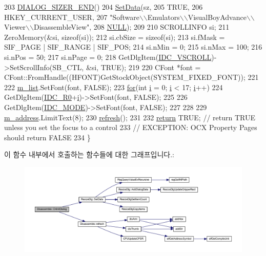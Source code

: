 \begin{DoxyCode}
203     \mbox{\hyperlink{_resize_dlg_8h_aeac0c1e32f30e0763df5736e4b3ea50a}{DIALOG\_SIZER\_END}}()
204     \mbox{\hyperlink{class_resize_dlg_a6a3965f44a0c2f5ba9aaa798a9a81df5}{SetData}}(sz,
205             TRUE,
206             HKEY\_CURRENT\_USER,
207             "Software\(\backslash\)\(\backslash\)Emulators\(\backslash\)\(\backslash\)VisualBoyAdvance\(\backslash\)\(\backslash\)Viewer\(\backslash\)\(\backslash\)DisassembleView",
208             \mbox{\hyperlink{getopt1_8c_a070d2ce7b6bb7e5c05602aa8c308d0c4}{NULL}});
209 
210   SCROLLINFO si;
211   ZeroMemory(&si, sizeof(si));
212   si.cbSize = sizeof(si);
213   si.fMask = SIF\_PAGE | SIF\_RANGE | SIF\_POS;
214   si.nMin = 0;
215   si.nMax = 100;
216   si.nPos = 50;
217   si.nPage = 0;
218   GetDlgItem(\mbox{\hyperlink{resource_8h_a420d68e24dfd23b92f4c35464790687e}{IDC\_VSCROLL}})->SetScrollInfo(SB\_CTL, &si, TRUE);
219   
220   CFont *font = CFont::FromHandle((HFONT)GetStockObject(SYSTEM\_FIXED\_FONT));
221   
222   \mbox{\hyperlink{class_disassemble_a99205259bac8d57ff61ca23458f76634}{m\_list}}.SetFont(font, FALSE);
223   \mbox{\hyperlink{expr-lex_8cpp_aa656b692c972ef767f6fe691b696c978}{for}}(\textcolor{keywordtype}{int} \mbox{\hyperlink{expr-lex_8cpp_acb559820d9ca11295b4500f179ef6392}{i}} = 0; \mbox{\hyperlink{expr-lex_8cpp_acb559820d9ca11295b4500f179ef6392}{i}} < 17; \mbox{\hyperlink{expr-lex_8cpp_acb559820d9ca11295b4500f179ef6392}{i}}++)
224     GetDlgItem(\mbox{\hyperlink{resource_8h_ab22910476aba368f21be1572a58db5ca}{IDC\_R0}}+\mbox{\hyperlink{expr-lex_8cpp_acb559820d9ca11295b4500f179ef6392}{i}})->SetFont(font, FALSE);
225 
226   GetDlgItem(\mbox{\hyperlink{resource_8h_a496f68890fb20f445e7456d458757bf2}{IDC\_MODE}})->SetFont(font, FALSE);
227   
228 
229   \mbox{\hyperlink{class_disassemble_a74582f94dacc9f2eac347fd59b2a906b}{m\_address}}.LimitText(8);
230   \mbox{\hyperlink{class_disassemble_a7cdf11d53ce0f170ad7dd8fc66961805}{refresh}}();
231   
232   \mbox{\hyperlink{gb_codes_8h_a9717e7bbecb906637e86cef6da3d83c2}{return}} TRUE;  \textcolor{comment}{// return TRUE unless you set the focus to a control}
233                 \textcolor{comment}{// EXCEPTION: OCX Property Pages should return FALSE}
234 \}
\end{DoxyCode}
이 함수 내부에서 호출하는 함수들에 대한 그래프입니다.\+:
\nopagebreak
\begin{figure}[H]
\begin{center}
\leavevmode
\includegraphics[width=350pt]{class_disassemble_a23e74e8f32758c5b6ff63914633e2ab5_cgraph}
\end{center}
\end{figure}
\mbox{\label{class_disassemble_a9d25720f4d6c7a31281301b93b0ae02a}} 
